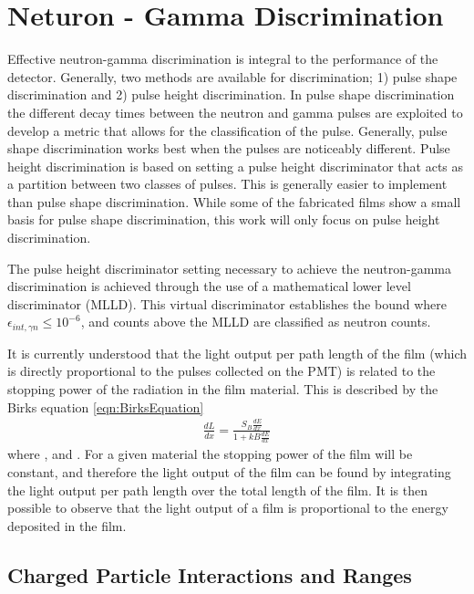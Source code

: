 \chapter{Neturon - Gamma Discrimination}
\label{ch:SecElectron}

Effective neutron-gamma discrimination is integral to the performance of the detector.
Generally, two methods are available for discrimination; 1) pulse shape discrimination and 2) pulse height discrimination.
In pulse shape discrimination the different decay times between the neutron and gamma pulses are exploited to develop a metric that allows for the classification of the pulse.
Generally, pulse shape discrimination works best when the pulses are noticeably different.
Pulse height discrimination is based on setting a pulse height discriminator that acts as a partition between two classes of pulses.
This is generally easier to implement than pulse shape discrimination.
While some of the fabricated films show a small basis for pulse shape discrimination, this work will only focus on pulse height discrimination.

The pulse height discriminator setting necessary to achieve the neutron-gamma discrimination is achieved through the use of a mathematical lower level discriminator (MLLD).
This virtual discriminator establishes the bound where $\epsilon_{int,\gamma n}\leq 10^{-6}$, and counts above the MLLD are classified as neutron counts. 

It is currently understood that the light output per path length of the film (which is directly proportional to the pulses collected on the PMT) is related to the stopping power of the radiation in the film material.
This is described by the Birks equation \eqref{eqn:BirksEquation}
\begin{align}
  \label{eqn:BirksEquation}
  \frac{dL}{dx} = \frac{S_B\frac{dE}{dx}}{1+kB\frac{dE}{dx}}
\end{align}
where , and .
For a given material the stopping power of the film will be constant, and therefore the light output of the film can be found by integrating the light output per path length over the total length of the film.
It is then possible to observe that the light output of a film is proportional to the energy deposited in the film.

\section{Charged Particle Interactions and Ranges}

